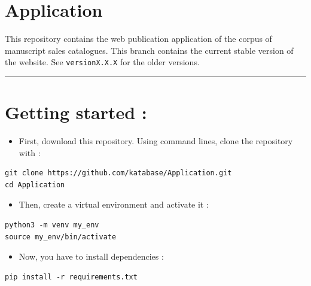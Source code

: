 \section*{Application}

This repository contains the web publication application of the corpus of manuscript 
sales catalogues. This branch contains the current stable version of the website. See
\texttt{versionX.X.X} for the older versions.

\par\noindent\rule{\linewidth}{0.4pt}
\section*{Getting started :}

\begin{itemize}
\item First, download this repository. Using command lines, clone the repository with : 
\end{itemize}

\begin{listing}[h!]
   \begin{verbatim}
git clone https://github.com/katabase/Application.git
cd Application

   \end{verbatim}
\end{listing}

\begin{itemize}
\item Then, create a virtual environment and activate it : 
\end{itemize}

\begin{listing}[h!]
   \begin{verbatim}
python3 -m venv my_env
source my_env/bin/activate

   \end{verbatim}
\end{listing}

\begin{itemize}
\item Now, you have to install dependencies : 
\end{itemize}

\begin{listing}[h!]
   \begin{verbatim}
pip install -r requirements.txt

   \end{verbatim}
\end{listing}

